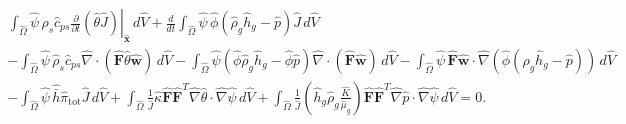 \documentclass[11pt]{article}
\begin{document}
\begin{multline}
\int_{\widehat{\Omega}}
\widehat{\psi}\,\widehat{\rho}_{s} \widehat{c}_{ps} \left. \frac{\partial}{\partial t} \left( \widehat{\theta} \widehat{J} \right)\right|_{\widehat{\mathbf{x}}} \,d\widehat{V}
+ \frac{d}{dt} \int_{\widehat{\Omega}}
\widehat{\psi}\,\widehat{\phi}(\widehat{\rho}_g \widehat{h}_g - \widehat{p}) \widehat{J}\,d\widehat{V}
\\
- \int_{\widehat{\Omega}}
\widehat{\psi}\,\widehat{\rho}_{s} \widehat{c}_{ps}
\widehat{\nabla} \cdot \left( \widehat{\mathbf{F}} \widehat{\theta} \widehat{\mathbf{w}} \right) \,d\widehat{V}
- \int_{\widehat{\Omega}} \widehat{\psi} \left( \widehat{\phi} \widehat{\rho}_g \widehat{h}_g - \widehat{\phi} \widehat{p} \right)
\widehat{\nabla} \cdot \left( \widehat{\mathbf{F}} \widehat{\mathbf{w}} \right) \,d\widehat{V}
- \int_{\widehat{\Omega}}
\widehat{\psi}\, \widehat{\mathbf{F}} \widehat{\mathbf{w}} \cdot
\widehat{\nabla}\left( \widehat{\phi}(\widehat{\rho}_g \widehat{h}_g - \widehat{p}) \right) \,d\widehat{V}
\\
- \int_{\widehat{\Omega}}
\widehat{\psi}\,\widehat{\bar{h}} \widehat{\pi}_{\mathrm{tot}}\widehat{J}\,d\widehat{V}
+ \int_{\widehat{\Omega}}
\frac{1}{\widehat{J}}
 \widehat{\kappa}
 \widehat{\mathbf{F}} \widehat{\mathbf{F}}^{T} \widehat{\nabla}\widehat{\theta}
\cdot\widehat{\nabla}\widehat{\psi} \,d\widehat{V}
+ \int_{\widehat{\Omega}}
\frac{1}{\widehat{J}}
\left(
\widehat{h}_g \widehat{\rho}_g
\frac{\widehat{K}}{\widehat{\mu}_g} \right) \widehat{\mathbf{F}} \widehat{\mathbf{F}}^{T} \widehat{\nabla} \widehat{p}
\cdot
\widehat{\nabla}\widehat{\psi}
\,d\widehat{V}
= 0.
\end{multline}
\end{document}
